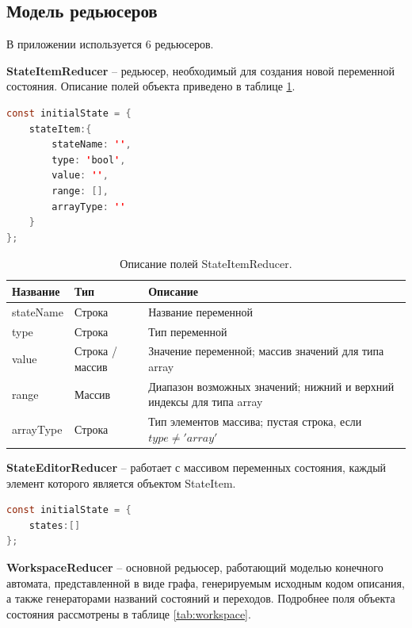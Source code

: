 \subsection{Модель редьюсеров}

В приложении используется 6 редьюсеров.

\textbf{StateItemReducer} -- редьюсер, необходимый для создания новой переменной состояния. Описание полей объекта приведено в таблице \ref{tab:state_item}.

\begin{lstlisting}[language=Java,
caption={Инициализация состояния StateItemReducer.}]
const initialState = {
	stateItem:{
		stateName: '',
		type: 'bool',
		value: '',
		range: [],
		arrayType: ''
	}
};
\end{lstlisting}

\begin{table}[ht]
	\caption{Описание полей StateItemReducer.}\label{tab:state_item}
	\centering
	\begin{tabular}{|m{2.5 cm}|m{1.5 cm}|m{4.75 cm}|}
		\hline
		Название & Тип & Описание \\
		\hline
		stateName & Строка & Название переменной \\
		\hline
		type & Строка & Тип переменной \\
		\hline
		value & Строка / массив & Значение переменной; массив значений для типа array \\
		\hline
		range & Массив & Диапазон возможных значений; нижний и верхний индексы для типа array \\
		\hline
		arrayType & Строка & Тип элементов массива; пустая строка, если $type\neq'array'$\\
		\hline
	\end{tabular}
\end{table}

\newpage

\textbf{StateEditorReducer} -- работает с массивом переменных состояния, каждый элемент которого является объектом StateItem.

\begin{lstlisting}[language=Java,
caption={Инициализация состояния StateEditorReducer.}]
const initialState = {
	states:[]
};
\end{lstlisting}

\textbf{WorkspaceReducer} -- основной редьюсер, работающий моделью конечного автомата, представленной в виде графа, генерируемым исходным кодом описания, а также генераторами названий состояний и переходов. Подробнее поля объекта состояния рассмотрены в таблице \ref{tab:workspace}.

